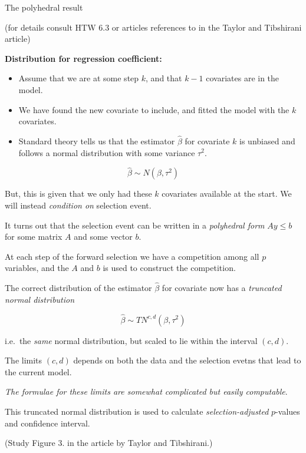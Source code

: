 \documentclass[
  ignorenonframetext,
]{beamer}
\providecommand{\tightlist}{%
  \setlength{\itemsep}{0pt}\setlength{\parskip}{0pt}}
\begin{document}
\begin{frame}

\begin{block}{The polyhedral result}

(for details consult HTW 6.3 or articles references to in the Taylor and
Tibshirani article)

\textbf{Distribution for regression coefficient:}

\begin{itemize}
\tightlist
\item
  Assume that we are at some step \(k\), and that \(k-1\) covariates are
  in the model.
\item
  We have found the new covariate to include, and fitted the model with
  the \(k\) covariates.
\item
  Standard theory tells us that the estimator \(\hat{\beta}\) for
  covariate \(k\) is unbiased and follows a normal distribution with
  some variance \(\tau^2\).
\end{itemize}

\[ \hat{\beta} \sim N(\beta,\tau^2)\]

\end{block}

\end{frame}

\begin{frame}

But, this is given that we only had these \(k\) covariates available at
the start. We will instead \emph{condition on} selection event.

It turns out that the selection event can be written in a
\emph{polyhedral form} \(A y \le b\) for some matrix \(A\) and some
vector \(b\).

At each step of the forward selection we have a competition among all
\(p\) variables, and the \(A\) and \(b\) is used to construct the
competition.

\end{frame}

\begin{frame}

The correct distribution of the estimator \(\hat{\beta}\) for covariate
now has a \emph{truncated normal distribution}

\[ \hat{\beta} \sim TN^{c,d}(\beta,\tau^2)\]

i.e.~the \emph{same} normal distribution, but scaled to lie within the
interval \((c,d)\).

The limits \((c,d)\) depends on both the data and the selection evetns
that lead to the current model.

\emph{The formulae for these limits are somewhat complicated but easily
computable}.

This truncated normal distribution is used to calculate
\emph{selection-adjusted} \(p\)-values and confidence interval.

(Study Figure 3. in the article by Taylor and Tibshirani.)

\end{frame}
\end{document}
